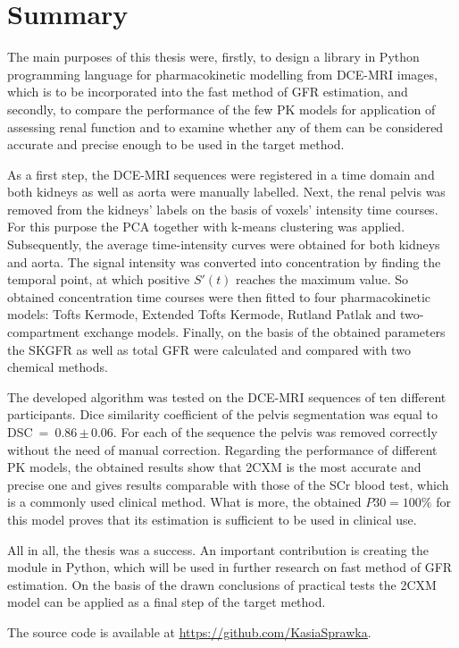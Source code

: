 \chapter{Summary}


The main purposes of this thesis were, firstly, to design a library in Python programming language for pharmacokinetic modelling from DCE-MRI images, which is to be incorporated into the fast method of GFR estimation, and secondly, to compare the performance of the few PK models for application of assessing renal function and to examine whether any of them can be considered accurate and precise enough to be used in the target method.

As a first step, the DCE-MRI sequences were registered in a time domain and both kidneys as well as aorta were manually labelled. Next, the renal pelvis was removed from the kidneys' labels on the basis of voxels' intensity time courses. For this purpose the PCA together with k-means clustering was applied. Subsequently, the average time-intensity curves were obtained for both kidneys and aorta. The signal intensity was converted into concentration by finding the temporal point, at which positive $S'(t)$ reaches the maximum value. So obtained concentration time courses were then fitted to four pharmacokinetic models: Tofts Kermode, Extended Tofts Kermode, Rutland Patlak and two-compartment exchange models. Finally, on the basis of the obtained parameters the SKGFR as well as total GFR were calculated and compared with two chemical methods. 
  
The developed algorithm was tested on the DCE-MRI sequences of ten different participants. Dice similarity coefficient of the pelvis segmentation was equal to DSC~=~0.86\,$\pm$\,0.06. For each of the sequence the pelvis was removed correctly without the need of manual correction. Regarding the performance of different PK models, the obtained results show that 2CXM is the most accurate and precise one and gives results comparable with those of the SCr blood test, which is a commonly used clinical method. What is more, the obtained $P30 = 100\%$ for this model proves that its estimation is sufficient to be used in clinical use.   

All in all, the thesis was a success. An important contribution is creating the module in Python, which will be used in further research on fast method of GFR estimation.  
On the basis of the drawn conclusions of practical tests the 2CXM model can be applied as a final step of the target method.

The source code is available at \underline{\url{https://github.com/KasiaSprawka}}.